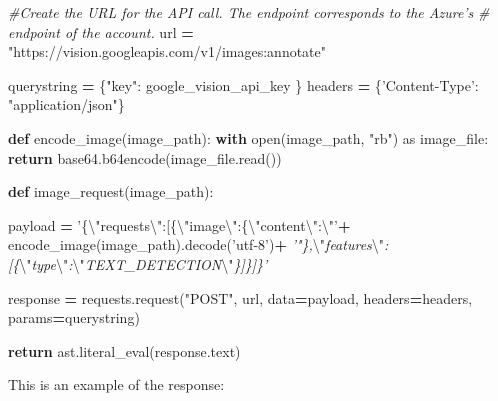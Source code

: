 \documentclass[
]{article}
\newenvironment{Shaded}{\begin{snugshade}}{\end{snugshade}}
\newcommand{\BuiltInTok}[1]{#1}
\newcommand{\CharTok}[1]{\textcolor[rgb]{0.31,0.60,0.02}{#1}}
\newcommand{\CommentTok}[1]{\textcolor[rgb]{0.56,0.35,0.01}{\textit{#1}}}
\newcommand{\ControlFlowTok}[1]{\textcolor[rgb]{0.13,0.29,0.53}{\textbf{#1}}}
\newcommand{\ImportTok}[1]{#1}
\newcommand{\KeywordTok}[1]{\textcolor[rgb]{0.13,0.29,0.53}{\textbf{#1}}}
\newcommand{\NormalTok}[1]{#1}
\newcommand{\OperatorTok}[1]{\textcolor[rgb]{0.81,0.36,0.00}{\textbf{#1}}}
\newcommand{\StringTok}[1]{\textcolor[rgb]{0.31,0.60,0.02}{#1}}
\begin{document}
\begin{Shaded}
\begin{Highlighting}[]
\CommentTok{#Create the URL for the API call. The endpoint corresponds to the Azure's }
\CommentTok{# endpoint of the account.}
\NormalTok{url }\OperatorTok{=} \StringTok{"https://vision.googleapis.com/v1/images:annotate"}

\NormalTok{querystring }\OperatorTok{=}\NormalTok{ \{}\StringTok{"key"}\NormalTok{: google_vision_api_key \}}
\NormalTok{headers }\OperatorTok{=}\NormalTok{ \{}\StringTok{'Content-Type'}\NormalTok{: }\StringTok{"application/json"}\NormalTok{\}}

\KeywordTok{def}\NormalTok{ encode_image(image_path):}
    \ControlFlowTok{with} \BuiltInTok{open}\NormalTok{(image_path, }\StringTok{"rb"}\NormalTok{) }\ImportTok{as}\NormalTok{ image_file:}
        \ControlFlowTok{return}\NormalTok{ base64.b64encode(image_file.read())}

\KeywordTok{def}\NormalTok{ image_request(image_path):}

\NormalTok{    payload }\OperatorTok{=} \StringTok{'\{}\CharTok{\textbackslash{}"}\StringTok{requests}\CharTok{\textbackslash{}"}\StringTok{:[\{}\CharTok{\textbackslash{}"}\StringTok{image}\CharTok{\textbackslash{}"}\StringTok{:\{}\CharTok{\textbackslash{}"}\StringTok{content}\CharTok{\textbackslash{}"}\StringTok{:}\CharTok{\textbackslash{}"}\StringTok{'}\OperatorTok{+}
\NormalTok{    encode_image(image_path).decode(}\StringTok{'utf-8'}\NormalTok{)}\OperatorTok{+}
    \CommentTok{'"\},}\CharTok{\textbackslash{}"}\CommentTok{features}\CharTok{\textbackslash{}"}\CommentTok{:[\{}\CharTok{\textbackslash{}"}\CommentTok{type}\CharTok{\textbackslash{}"}\CommentTok{:}\CharTok{\textbackslash{}"}\CommentTok{TEXT_DETECTION}\CharTok{\textbackslash{}"}\CommentTok{\}]\}]\}'}

\NormalTok{    response }\OperatorTok{=}\NormalTok{ requests.request(}\StringTok{"POST"}\NormalTok{, url, data}\OperatorTok{=}\NormalTok{payload, headers}\OperatorTok{=}\NormalTok{headers, params}\OperatorTok{=}\NormalTok{querystring)}

    \ControlFlowTok{return}\NormalTok{ ast.literal_eval(response.text)}
\end{Highlighting}
\end{Shaded}

This is an example of the response:
\end{document}
